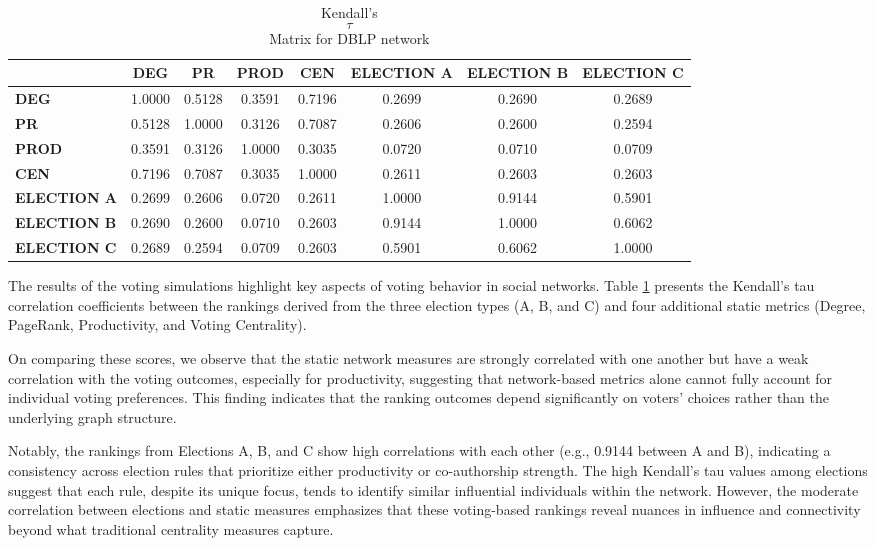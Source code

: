 \documentclass{article} %
\begin{document}
\begin{table}[h]
\caption{Kendall's \[\tau\] Matrix for DBLP network}
\label{kendall's-tau-matrix}
\begin{center}
\begin{tabular}{l|ccccccc}
\hline
 & \textbf{DEG} & \textbf{PR} & \textbf{PROD} & \textbf{CEN} & \textbf{ELECTION A} & \textbf{ELECTION B} & \textbf{ELECTION C} \\
\hline
\textbf{DEG} & 1.0000 & 0.5128 & 0.3591 & 0.7196 & 0.2699 & 0.2690 & 0.2689 \\
\textbf{PR} & 0.5128 & 1.0000 & 0.3126 & 0.7087 & 0.2606 & 0.2600 & 0.2594 \\
\textbf{PROD} & 0.3591 & 0.3126 & 1.0000 & 0.3035 & 0.0720 & 0.0710 & 0.0709 \\
\textbf{CEN} & 0.7196 & 0.7087 & 0.3035 & 1.0000 & 0.2611 & 0.2603 & 0.2603 \\
\textbf{ELECTION A} & 0.2699 & 0.2606 & 0.0720 & 0.2611 & 1.0000 & 0.9144 & 0.5901 \\
\textbf{ELECTION B} & 0.2690 & 0.2600 & 0.0710 & 0.2603 & 0.9144 & 1.0000 & 0.6062 \\
\textbf{ELECTION C} & 0.2689 & 0.2594 & 0.0709 & 0.2603 & 0.5901 & 0.6062 & 1.0000 \\
\hline
\end{tabular}
\end{center}
\end{table}

The results of the voting simulations highlight key aspects of voting behavior in social networks. Table \ref{kendall's-tau-matrix} presents the Kendall’s tau correlation coefficients between the rankings derived from the three election types (A, B, and C) and four additional static metrics (Degree, PageRank, Productivity, and Voting Centrality). 

On comparing these scores, we observe that the static network measures are strongly correlated with one another but have a weak correlation with the voting outcomes, especially for productivity, suggesting that network-based metrics alone cannot fully account for individual voting preferences. This finding indicates that the ranking outcomes depend significantly on voters' choices rather than the underlying graph structure. 

Notably, the rankings from Elections A, B, and C show high correlations with each other (e.g., 0.9144 between A and B), indicating a consistency across election rules that prioritize either productivity or co-authorship strength. The high Kendall’s tau values among elections suggest that each rule, despite its unique focus, tends to identify similar influential individuals within the network. However, the moderate correlation between elections and static measures emphasizes that these voting-based rankings reveal nuances in influence and connectivity beyond what traditional centrality measures capture.
\end{document}
